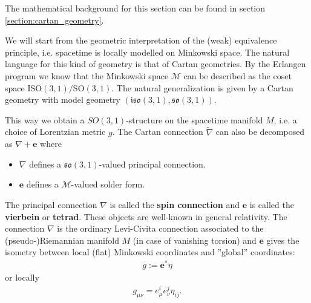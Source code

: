     The mathematical background for this section can be found in section \ref{section:cartan_geometry}.

    We will start from the geometric interpretation of the (weak) equivalence principle, i.e. spacetime is locally modelled on Minkowski space. The natural language for this kind of geometry is that of Cartan geometries. By the Erlangen program we know that the Minkowski space $\mathcal{M}$ can be described as the coset space $\text{ISO}(3,1)/\text{SO}(3,1)$. The natural generalization is given by a Cartan geometry with model geometry $(\mathfrak{iso}(3,1), \mathfrak{so}(3,1))$.

    This way we obtain a $SO(3,1)$-structure on the spacetime manifold $M$, i.e. a choice of Lorentzian metric $g$. The Cartan connection $\widetilde{\nabla}$ can also be decomposed as $\nabla+\mathbf{e}$ where
    \begin{itemize}
        \item $\nabla$ defines a $\mathfrak{so}(3,1)$-valued principal connection.
        \item $\mathbf{e}$ defines a $\mathcal{M}$-valued solder form.
    \end{itemize}
    The principal connection $\nabla$ is called the \textbf{spin connection} and $\mathbf{e}$ is called the \textbf{vierbein} or \textbf{tetrad}. These objects are well-known in general relativity. The connection $\nabla$ is the ordinary Levi-Civita connection associated to the (pseudo-)Riemannian manifold $M$ (in case of vanishing torsion) and $\mathbf{e}$ gives the isometry between local (flat) Minkowski coordinates and ''global'' coordinates:
    \begin{gather}
        g := \mathbf{e}^*\eta
    \end{gather}
    or locally
    \begin{gather}
        g_{\mu\nu} = e^i_\mu e^j_\nu\eta_{ij}.
    \end{gather}


